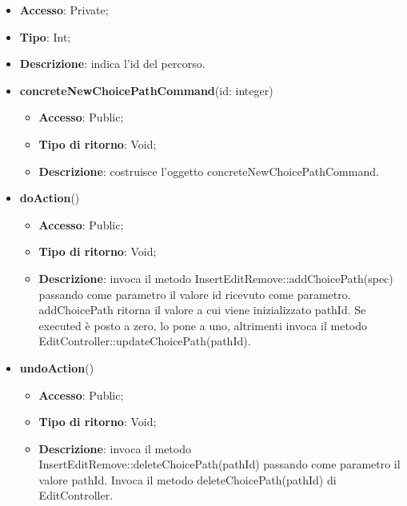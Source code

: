 {{{\begin{itemize}
			\begin{itemize}
				\item \textbf{Accesso}: Private;
				\item \textbf{Tipo}: Int;
				\item \textbf{Descrizione}: indica l'id del percorso.
			\end{itemize}
			\begin{itemize}
				\item \textbf{concreteNewChoicePathCommand}(id: integer)
				\begin{itemize}
					\item \textbf{Accesso}: Public;
					\item \textbf{Tipo di ritorno}: Void;
					\item \textbf{Descrizione}: costruisce l’oggetto concreteNewChoicePathCommand.
				\end{itemize}
				\item \textbf{doAction}()
				\begin{itemize}
					\item \textbf{Accesso}: Public;
					\item \textbf{Tipo di ritorno}: Void;
					\item \textbf{Descrizione}: invoca il metodo InsertEditRemove::addChoicePath(spec) passando come parametro il valore id ricevuto come parametro.  addChoicePath ritorna il valore a cui viene inizializzato pathId. Se executed è posto a zero, lo pone a uno, altrimenti invoca il metodo EditController::updateChoicePath(pathId).
				\end{itemize}
				\item \textbf{undoAction}()
				\begin{itemize}
					\item \textbf{Accesso}: Public;
					\item \textbf{Tipo di ritorno}: Void;
					\item \textbf{Descrizione}: invoca il metodo InsertEditRemove::deleteChoicePath(pathId) passando come parametro il valore pathId. Invoca il metodo deleteChoicePath(pathId) di EditController.
				\end{itemize}
			\end{itemize}
			\end{itemize}

}}}
